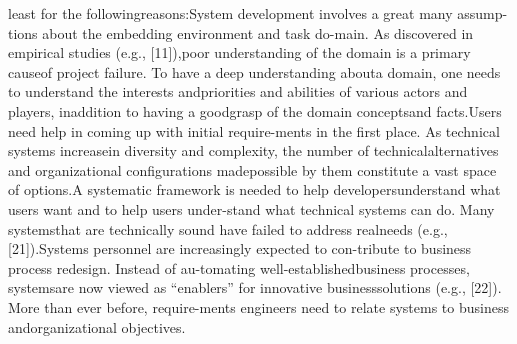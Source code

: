 least for the followingreasons:System development involves a great many assump-tions about the embedding environment and task do-main. As discovered in empirical studies (e.g., [11]),poor understanding of the domain is a primary causeof project failure. To have a deep understanding abouta domain, one needs to understand the interests andpriorities and abilities of various actors and players, inaddition to having a goodgrasp of the domain conceptsand facts.Users need help in coming up with initial require-ments in the ﬁrst place. As technical systems increasein diversity and complexity, the number of technicalalternatives and organizational conﬁgurations madepossible by them constitute a vast space of options.A systematic framework is needed to help developersunderstand what users want and to help users under-stand what technical systems can do. Many systemsthat are technically sound have failed to address realneeds (e.g., [21]).Systems personnel are increasingly expected to con-tribute to business process redesign. Instead of au-tomating well-establishedbusiness processes, systemsare now viewed as “enablers” for innovative businesssolutions (e.g., [22]). More than ever before, require-ments engineers need to relate systems to business andorganizational objectives.
